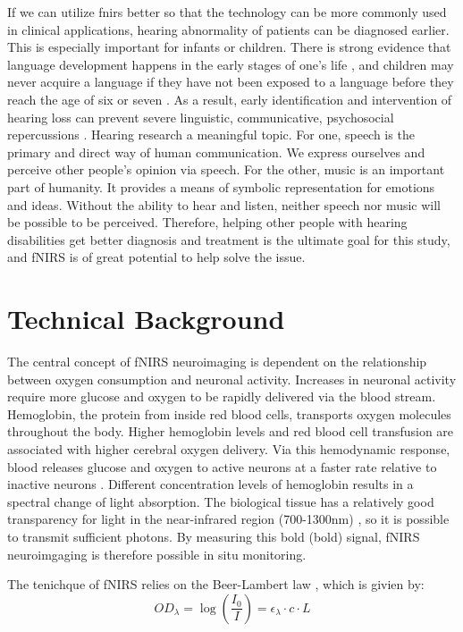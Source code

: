 If we can utilize \acrshort{fnirs} better so that the technology can be more commonly used in clinical applications, hearing abnormality of patients can be diagnosed earlier. This is especially important for infants or children. There is strong evidence that language development happens in the early stages of one's life \citep {Elissa1990}, and children may never acquire a language if they have not been exposed to a language before they reach the age of six or seven \citep {clark2000first}. As a result, early identification and intervention of hearing loss can prevent severe linguistic, communicative, psychosocial repercussions \citep {Robinshaw1995} \citep {Yoshinaga1998}. Hearing research a meaningful topic. For one, speech is the primary and direct way of human communication. We express ourselves and perceive other people's opinion via speech. For the other, music is an important part of humanity. It provides a means of symbolic representation for emotions and ideas. Without the ability to hear and listen, neither speech nor music will be possible to be perceived. Therefore, helping other people with hearing disabilities get better diagnosis and treatment is the ultimate goal for this study, and fNIRS is of great potential to help solve the issue.

\section{Technical Background}
The central concept of fNIRS neuroimaging is dependent on the relationship between oxygen consumption and neuronal activity. Increases in neuronal activity require more glucose and oxygen to be rapidly delivered via the blood stream. Hemoglobin, the protein from inside red blood cells, transports oxygen molecules throughout the body. Higher hemoglobin levels and red blood cell transfusion are associated with higher cerebral oxygen delivery. Via this hemodynamic response, blood releases glucose and oxygen to active neurons at a faster rate relative to inactive neurons \citep {Pelphrey2013}. Different concentration levels of hemoglobin results in a spectral change of light absorption. The biological tissue has a relatively good transparency for light in the near-infrared region (700-1300nm) \citep{doi:10.1126/science.929199}, so it is possible to transmit sufficient photons. By measuring this \acrlong{bold} (\acrshort{bold}) signal, fNIRS neuroimgaging is therefore possible in situ monitoring.

\newpage
The tenichque of fNIRS relies on the Beer-Lambert law \citep{ BeerLambert}, which is givien by:
\begin{equation} 
OD_{\lambda} = \log \left(\frac {I_0}{I}\right) = \epsilon _{\lambda} \cdot c \cdot L
\end{equation}

